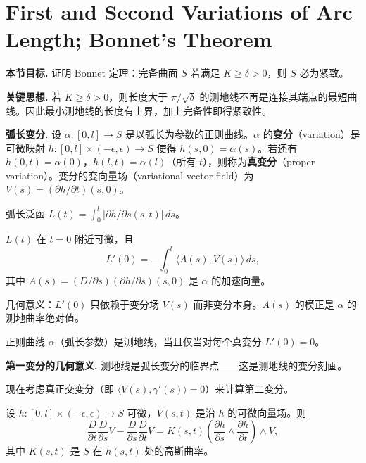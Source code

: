 \section{First and Second Variations of Arc Length; Bonnet's Theorem}\label{sec:bonnet-theorem}

\textbf{本节目标.} 证明 Bonnet 定理：完备曲面 $S$ 若满足 $K \geq \delta > 0$，则 $S$ 必为紧致。

\textbf{关键思想.} 若 $K \geq \delta > 0$，则长度大于 $\pi/\sqrt{\delta}$ 的测地线不再是连接其端点的最短曲线。因此最小测地线的长度有上界，加上完备性即得紧致性。

\textbf{弧长变分.} 设 $\alpha: [0,l] \to S$ 是以弧长为参数的正则曲线。$\alpha$ 的\textbf{变分}（variation）是可微映射 $h: [0,l] \times (-\epsilon,\epsilon) \to S$ 使得 $h(s,0) = \alpha(s)$。若还有 $h(0,t) = \alpha(0)$，$h(l,t) = \alpha(l)$（所有 $t$），则称为\textbf{真变分}（proper variation）。变分的变向量场（variational vector field）为 $V(s) = (\partial h/\partial t)(s,0)$。

弧长泛函 $L(t) = \int_0^l |\partial h/\partial s(s,t)|\,ds$。

\begin{Lemma}\label{first-variation-formula}
$L(t)$ 在 $t=0$ 附近可微，且
\[
L'(0) = -\int_0^l \langle A(s), V(s)\rangle\,ds,
\]
其中 $A(s) = (D/\partial s)(\partial h/\partial s)(s,0)$ 是 $\alpha$ 的加速向量。
\end{Lemma}

\begin{Remark}
几何意义：$L'(0)$ 只依赖于变分场 $V(s)$ 而非变分本身。$A(s)$ 的模正是 $\alpha$ 的测地曲率绝对值。
\end{Remark}

\begin{Proposition}\label{prop:geodesic-first-variation}
正则曲线 $\alpha$（弧长参数）是测地线，当且仅当对每个真变分 $L'(0) = 0$。
\end{Proposition}

\textbf{第一变分的几何意义.} 测地线是弧长变分的临界点——这是测地线的变分刻画。

现在考虑真正交变分（即 $\langle V(s),\gamma'(s)\rangle = 0$）来计算第二变分。

\begin{Lemma}\label{curvature-commutation}
设 $h: [0,l]\times(-\epsilon,\epsilon) \to S$ 可微，$V(s,t)$ 是沿 $h$ 的可微向量场。则
\[
\frac{D}{\partial t}\frac{D}{\partial s}V - \frac{D}{\partial s}\frac{D}{\partial t}V = K(s,t)\left(\frac{\partial h}{\partial s} \wedge \frac{\partial h}{\partial t}\right)\wedge V,
\]
其中 $K(s,t)$ 是 $S$ 在 $h(s,t)$ 处的高斯曲率。
\end{Lemma}

